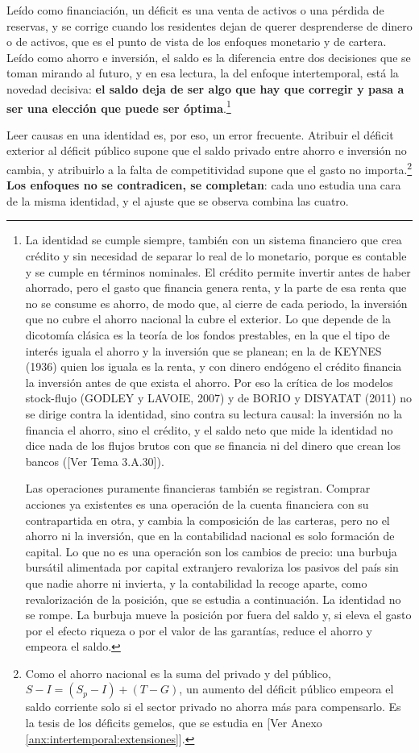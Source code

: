 \documentclass[10pt,a4paper]{article}
\newcommand{\authorfont}[1]{{\fontfamily{EBGaramond-TLF}\selectfont #1}}
\begin{document}
Leído como financiación, un déficit es una venta de activos o una pérdida de reservas, y se corrige cuando los residentes dejan de querer desprenderse de dinero o de activos, que es el punto de vista de los enfoques monetario y de cartera. Leído como ahorro e inversión, el saldo es la diferencia entre dos decisiones que se toman mirando al futuro, y en esa lectura, la del enfoque intertemporal, está la novedad decisiva: \textbf{el saldo deja de ser algo que hay que corregir y pasa a ser una elección que puede ser óptima}.\footnote{%
    La identidad se cumple siempre, también con un sistema financiero que crea crédito y sin necesidad de separar lo real de lo monetario, porque es contable y se cumple en términos nominales. El crédito permite invertir antes de haber ahorrado, pero el gasto que financia genera renta, y la parte de esa renta que no se consume es ahorro, de modo que, al cierre de cada periodo, la inversión que no cubre el ahorro nacional la cubre el exterior. Lo que depende de la dicotomía clásica es la teoría de los fondos prestables, en la que el tipo de interés iguala el ahorro y la inversión que se planean; en la de KEYNES (1936) quien los iguala es la renta, y con dinero endógeno el crédito financia la inversión antes de que exista el ahorro. Por eso la crítica de los modelos stock-flujo (GODLEY y LAVOIE, 2007) y de BORIO y DISYATAT (2011) no se dirige contra la identidad, sino contra su lectura causal: la inversión no la financia el ahorro, sino el crédito, y el saldo neto que mide la identidad no dice nada de los flujos brutos con que se financia ni del dinero que crean los bancos ([\authorfont{Ver Tema 3.A.30}]).

    Las operaciones puramente financieras también se registran. Comprar acciones ya existentes es una operación de la cuenta financiera con su contrapartida en otra, y cambia la composición de las carteras, pero no el ahorro ni la inversión, que en la contabilidad nacional es solo formación de capital. Lo que no es una operación son los cambios de precio: una burbuja bursátil alimentada por capital extranjero revaloriza los pasivos del país sin que nadie ahorre ni invierta, y la contabilidad la recoge aparte, como revalorización de la posición, que se estudia a continuación. La identidad no se rompe. La burbuja mueve la posición por fuera del saldo y, si eleva el gasto por el efecto riqueza o por el valor de las garantías, reduce el ahorro y empeora el saldo.
}

Leer causas en una identidad es, por eso, un error frecuente. Atribuir el déficit exterior al déficit público supone que el saldo privado entre ahorro e inversión no cambia, y atribuirlo a la falta de competitividad supone que el gasto no importa.\footnote{%
    Como el ahorro nacional es la suma del privado y del público, $S-I=(S_p-I)+(T-G)$, un aumento del déficit público empeora el saldo corriente solo si el sector privado no ahorra más para compensarlo. Es la tesis de los déficits gemelos, que se estudia en [\authorfont{Ver Anexo \ref{anx:intertemporal:extensiones}}].
} \textbf{Los enfoques no se contradicen, se completan}: cada uno estudia una cara de la misma identidad, y el ajuste que se observa combina las cuatro.
\end{document}
